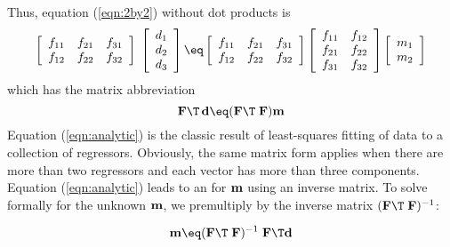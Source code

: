 Thus, equation (\ref{eqn:2by2}) without dot products is
\begin{equation}
\left[ 
\begin{array}{ccc}
  f_{11} & f_{21} & f_{31}  \\
  f_{12} & f_{22} & f_{32}  \end{array} \right] 
\; \left[ 
\begin{array}{c}
  d_1 \\ 
  d_2 \\ 
  d_3 \end{array} \right]
\eq
\left[ 
\begin{array}{ccc}
  f_{11} & f_{21} & f_{31}  \\
  f_{12} & f_{22} & f_{32}  \end{array} \right] 
\left[ 
\begin{array}{ccc}
  f_{11} & f_{12}  \\
  f_{21} & f_{22}  \\
  f_{31} & f_{32}  \end{array} \right] 
\left[ 
\begin{array}{ccc}
  m_1  \\
  m_2  \end{array} \right] 
\label{eqn:allmats}
\end{equation}
which has the matrix abbreviation
\begin{equation}
\bold F\T\,\dd \eq ( \bold F\T \; \bold F )  \bold m
\label{eqn:analytic}
\end{equation}
Equation
(\ref{eqn:analytic})
is the classic result of least-squares
fitting of data to a collection of regressors.
Obviously, the same matrix form applies when there are more than
two regressors and each vector has more than three components.
Equation
(\ref{eqn:analytic})
leads to an  for $\bold m$
using an inverse matrix.
To solve formally for the unknown $\bold m$,
we premultiply by the inverse matrix $( \bold F\T \; \bold F )^{-1}$:

\par
\begin{equation}
\bold m \eq
( \bold F\T \; \bold F )^{-1} \;
\bold F\T \dd 
\label{eqn:sln}
\end{equation}

